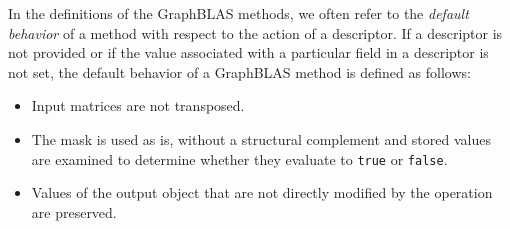 In the definitions of the GraphBLAS methods, we often refer to the \emph{default behavior} of a method with 
respect to the action of a descriptor.   If a descriptor is not provided or if the value associated with a particular field in a descriptor 
is not set, the default behavior of a GraphBLAS method is defined as follows:
\begin{itemize}
\item Input matrices are not transposed.
\item The mask is used as is, without a structural complement and stored values are examined to determine whether they evaluate to {\tt true} or {\tt false}.

\item Values of the output object that are not directly modified by the operation are preserved.
\end{itemize}


